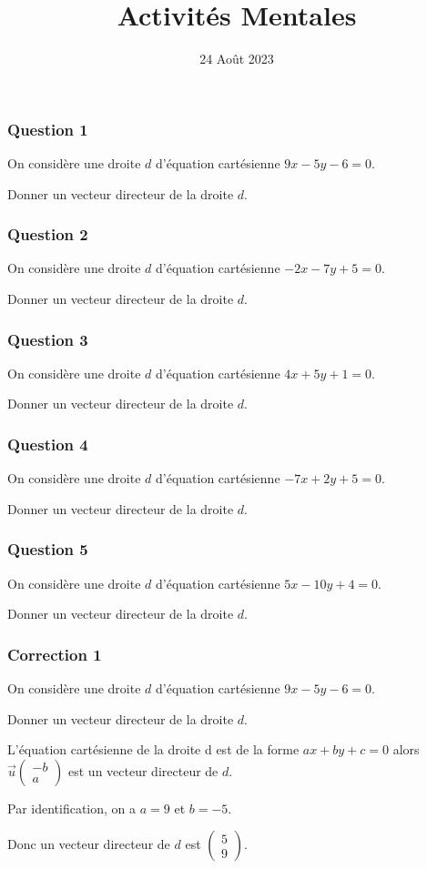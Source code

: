 \documentclass[15pt, mathserif]{beamer}
\title{Activités Mentales}
\date{24 Août 2023}
\newcommand{\vco}[2]{\begin{pmatrix} #1 \\ #2 \end{pmatrix}} %
\begin{document}
\begin{frame}
    \titlepage
\end{frame}

\begin{frame} 
	\frametitle{Question 1}
On considère une droite $d$ d'équation cartésienne $9x-5y-6=0$. 
 
 Donner un vecteur directeur de la droite $d$.\end{frame}


\begin{frame} 
	\frametitle{Question 2}
On considère une droite $d$ d'équation cartésienne $-2x-7y+5=0$. 
 
 Donner un vecteur directeur de la droite $d$.\end{frame}


\begin{frame} 
	\frametitle{Question 3}
On considère une droite $d$ d'équation cartésienne $4x+5y+1=0$. 
 
 Donner un vecteur directeur de la droite $d$.\end{frame}


\begin{frame} 
	\frametitle{Question 4}
On considère une droite $d$ d'équation cartésienne $-7x+2y+5=0$. 
 
 Donner un vecteur directeur de la droite $d$.\end{frame}


\begin{frame} 
	\frametitle{Question 5}
On considère une droite $d$ d'équation cartésienne $5x-10y+4=0$. 
 
 Donner un vecteur directeur de la droite $d$.\end{frame}


\begin{frame}
\vspace{-10mm}
	\frametitle{Correction 1}
 On considère une droite $d$ d'équation cartésienne $9x-5y-6=0$. 
 
 Donner un vecteur directeur de la droite $d$. 
 
 \bigskip 
 
 L'équation cartésienne de la droite d est de la forme $ax + by + c = 0$ alors $\overrightarrow{u}\vco{-b}{a}$ est un vecteur directeur de $d$. 
 
 Par identification, on a $a=9$ et $b=-5$. 
 
 Donc un vecteur directeur de $d$ est $\vco{5}{9}$.\end{frame}
\end{document}
